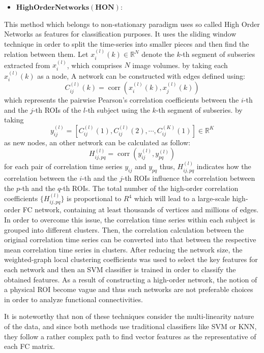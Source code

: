 \documentclass[preprint,12pt]{elsarticle}
\begin{document}
\begin{itemize}
	\item $\mathbf{High Order Networks(HON):}$
\end{itemize}
This method which belongs to non-stationary paradigm uses so called
High Order Networks as features for classification purposes. It uses the sliding window technique  in order to split the time-series into smaller pieces and then find the relation between them\cite{r51,r52}. Let $x_{i}^{(l)}(k) \in \mathbb{R}^N$ denote the $k$-th segment of subseries extracted from $x_{i}^{(l)}$, which comprises $N$ image volumes. by taking each $x_{i}^{(l)}(k)$ as a node, A network can be constructed with edges defined using:
\[
C_{ij}^{(l)}(k) = \operatorname{corr}\left(x_{i}^{(l)}(k),x_{j}^{(l)}(k)
\right)
\]
which represents the pairwise Pearson’s correlation coefficients
between the $i$-th and the $j$-th ROIs of the $l$-th subject using the $k$-th segment of subseries. 
by taking  
\[
y_{ij}^{(l)} = \left[ 
C_{ij}^{(l)}(1), C_{ij}^{(l)}(2), \cdots , C_{ij}^{(K)}(1) 
\right] \in \mathbb{R}^K
\]
as new nodes, an other network can be calculated as follow: 
\[
H_{ij,pq}^{(l)} = \operatorname{corr} \left(
y_{ij}^{(l)},y_{pq}^{(l)}
\right)
\]
for each pair of correlation time series $y_{ij}$ and $y_{pq}$ thus, $H_{ij,pq}^{(l)}$ indicates how the correlation between the $i$-th and the $j$-th ROIs influence the correlation between the $p$-th and the $q$-th ROIs.
The total number of the high-order correlation coefficients
$\{ H_{ij,pq}^{(l)} \}$ is proportional to $R^4$ which will lead to a large-scale high-order FC
network, containing at least thousands of vertices and millions
of edges. In order to overcome this issue, the correlation time series within each subject is grouped into different clusters. Then, the correlation calculation
between the original correlation time series can be
converted into that between the respective mean correlation
time series in clusters. After reducing the network size, the
weighted-graph local clustering coefficients was used to select the key features for each network and then an SVM classifier is trained in order to classify the obtained features. As a result of constructing a high-order network, the notion of a physical ROI become vague and thus such networks are not preferable choices in order to analyze  functional connectivities. 

It is noteworthy that non of these techniques consider the multi-linearity nature of the data, and since both methods use traditional classifiers like SVM or KNN, they follow a rather complex path to find vector features as the representative of each FC matrix.
	
\end{document}

